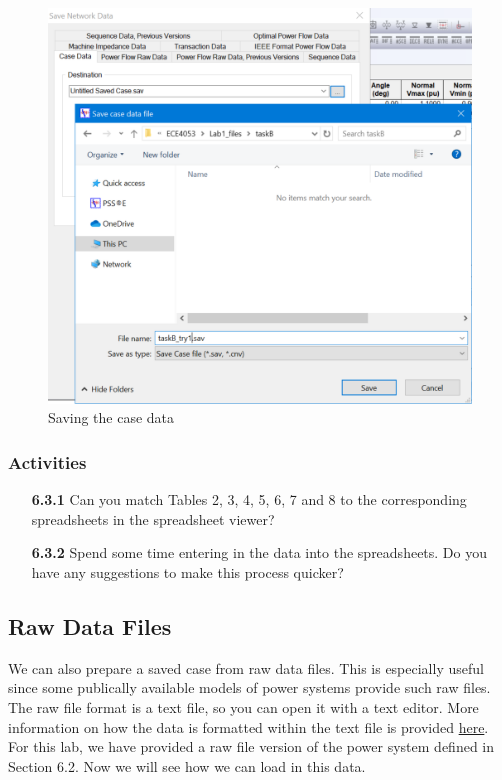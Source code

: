 \documentclass[paper=a4, fontsize=11pt]{article}
\begin{document}
\begin{figure}[h]
\centering
\includegraphics[scale=0.32]{fig9_save.pdf}
\caption{Saving the case data}
\label{fig:9}
\end{figure}

\subsubsection*{Activities}
\begin{enumerate}
\item[\textbf{6.3.1}] Can you match Tables 2, 3, 4, 5, 6, 7 and 8 to the corresponding spreadsheets in the spreadsheet viewer?
\item[\textbf{6.3.2}] Spend some time entering in the data into the spreadsheets. Do you have any suggestions to make this process quicker?
\end{enumerate}

\newpage
\subsection{Raw Data Files}
We can also prepare a saved case from raw data files. This is especially useful since some publically available models of power systems provide such raw files. The raw file format is a text file, so you can open it with a text editor. More information on how the data is formatted within the text file is provided \href{https://labs.ece.uw.edu/pstca/formats/pti.txt}{here}. For this lab, we have provided a raw file version of the power system defined in Section 6.2. Now we will see how we can load in this data.
\end{document}
